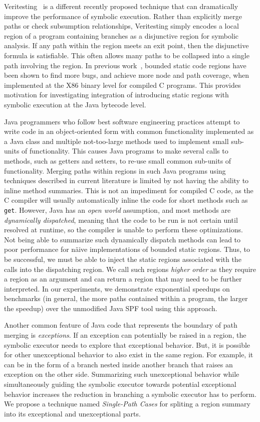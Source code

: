 %
Veritesting~\cite{veritesting} is a different recently proposed technique that can dramatically improve the performance of symbolic execution.  Rather than explicitly merge paths or check subsumption relationships, Veritesting simply encodes a local region of a program containing branches as a disjunctive region for symbolic analysis.  If any path within the region meets an exit point, then the disjunctive formula is satisfiable.  This often allows many paths to be collapsed into a single path involving the region.  
%
In previous work~\cite{veritesting}, bounded static code regions have been shown to find more bugs, and achieve more
node and path coverage, when implemented at the X86 binary level for compiled C programs.
%
This provides motivation for investigating integration of introducing static regions with symbolic execution at the Java
bytecode level.

Java programmers who follow best software engineering practices attempt to write code in an object-oriented
form with common functionality implemented as a Java class and multiple not-too-large methods used to implement small
sub-units of functionality.
%
This causes Java programs to make several calls to methods, such as getters and setters, to re-use small common sub-units
of functionality.
%
Merging paths within regions in such Java programs using techniques described in current literature is limited by not having the ability
to inline method summaries.
%
This is not an impediment for compiled C code, as the C compiler will usually automatically inline the code for short
methods such as \texttt{get}.
%
However, Java has an {\em open world} assumption, and most methods are {\em dynamically dispatched}, meaning that the code to be
run is not certain until resolved at runtime, so the compiler is unable to perform these optimizations.
%
Not being able to summarize such dynamically dispatch methods can lead to poor performance for
n\"aive implementations of bounded static regions.
%
Thus, to be successful, we must be able to inject the static regions associated with the calls into the dispatching
region.
%
We call such regions {\em higher order} as they require a region as an argument and can return a region that may need
to be further interpreted.
%
In our experiments, we demonstrate exponential speedups on benchmarks (in general, the more paths contained within a
program, the larger the speedup) over the unmodified Java SPF tool using this approach.

Another common feature of Java code that represents the boundary of path merging is \textit{exceptions}.
%
If an exception can potentially be raised in a region, the symbolic executor needs to explore that exceptional behavior.
%
But, it is possible for other unexceptional behavior to also exist in the same region.
%
For example, it can be in the form of a branch nested inside another branch that raises an exception on the other side.
%
Summarizing such unexceptional behavior while simultaneously guiding the symbolic executor towards potential exceptional
behavior increases the reduction in branching a symbolic executor has to perform.
%
We propose a technique named \textit{Single-Path Cases} for spliting a region summary into its exceptional and
unexceptional parts.

